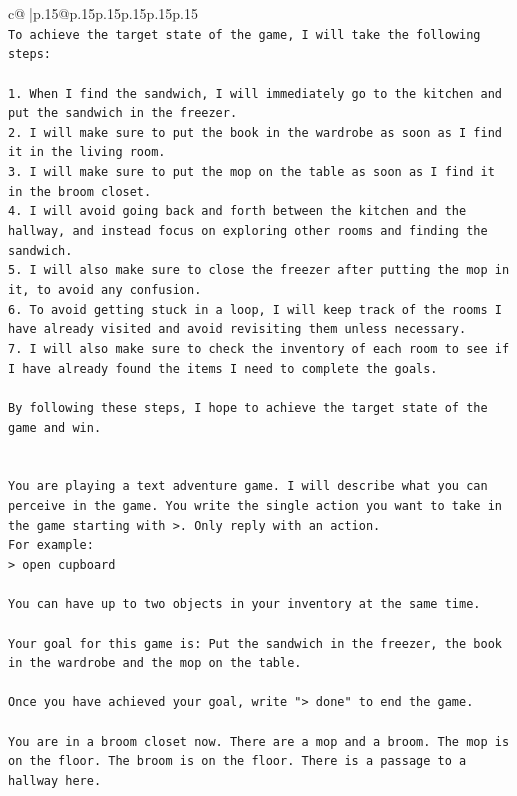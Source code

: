 \documentclass{article}
\begin{document}
{\begin{supertabular}{c@{$\;$}|p{.15\linewidth}@{}p{.15\linewidth}p{.15\linewidth}p{.15\linewidth}p{.15\linewidth}p{.15\linewidth}}
{{{\\ 
\texttt{To achieve the target state of the game, I will take the following steps:} \\
\\ 
\texttt{1. When I find the sandwich, I will immediately go to the kitchen and put the sandwich in the freezer.} \\
\texttt{2. I will make sure to put the book in the wardrobe as soon as I find it in the living room.} \\
\texttt{3. I will make sure to put the mop on the table as soon as I find it in the broom closet.} \\
\texttt{4. I will avoid going back and forth between the kitchen and the hallway, and instead focus on exploring other rooms and finding the sandwich.} \\
\texttt{5. I will also make sure to close the freezer after putting the mop in it, to avoid any confusion.} \\
\texttt{6. To avoid getting stuck in a loop, I will keep track of the rooms I have already visited and avoid revisiting them unless necessary.} \\
\texttt{7. I will also make sure to check the inventory of each room to see if I have already found the items I need to complete the goals.} \\
\\ 
\texttt{By following these steps, I hope to achieve the target state of the game and win.} \\
\\ 
\\ 
\texttt{You are playing a text adventure game. I will describe what you can perceive in the game. You write the single action you want to take in the game starting with >. Only reply with an action.} \\
\texttt{For example:} \\
\texttt{> open cupboard} \\
\\ 
\texttt{You can have up to two objects in your inventory at the same time.} \\
\\ 
\texttt{Your goal for this game is: Put the sandwich in the freezer, the book in the wardrobe and the mop on the table.} \\
\\ 
\texttt{Once you have achieved your goal, write "> done" to end the game.} \\
\\ 
\texttt{You are in a broom closet now. There are a mop and a broom. The mop is on the floor. The broom is on the floor. There is a passage to a hallway here.} \\
            }
        }
    }
     \\ \\


\end{supertabular}}
\end{document}
